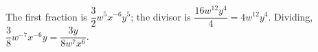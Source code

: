 The first fraction is $\dfrac{3}{2}w^5x^{-6}y^5$; the divisor is $\dfrac{16w^{12}y^4}{4}=4w^{12}y^4$. Dividing, $\dfrac{3}{8}w^{-7}x^{-6}y=\boxed{\dfrac{3y}{8w^7x^6}}$.
